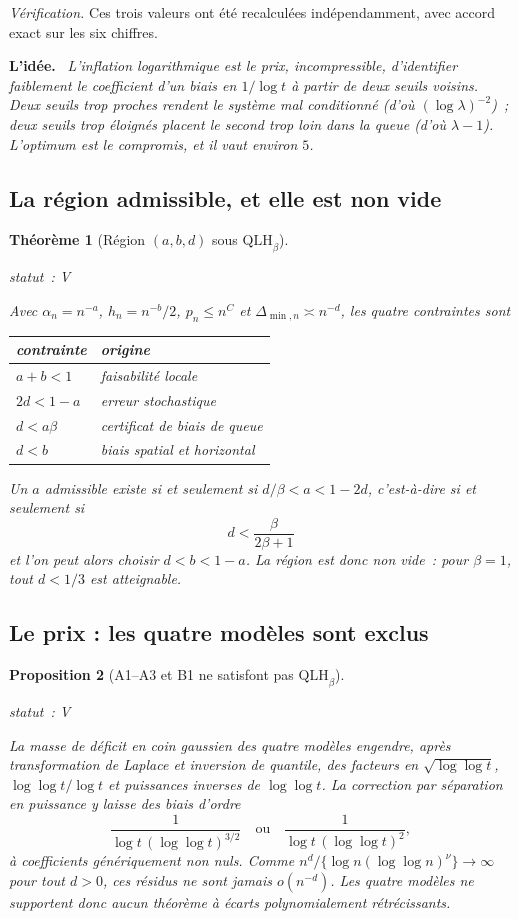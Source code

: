 \documentclass[11pt]{article}
\theoremstyle{plain}
\newtheorem{theoreme}{Théorème}[section]
\newtheorem{proposition}[theoreme]{Proposition}
\theoremstyle{definition}
\theoremstyle{remark}
\newcommand{\1}{\mathbf 1}
\newcommand{\statut}[1]{%
  \nopagebreak\par\nopagebreak
  \hfill{\normalfont\footnotesize\textcolor{gris}{statut~: #1}}%
  \par\nopagebreak\vspace{-2pt}}
\newenvironment{idee}
  {\par\medskip\noindent\textcolor{bleu}{\textbf{L'idée.}}\ \itshape}
  {\par\medskip}
\begin{document}
\noindent
\emph{Vérification.} Ces trois valeurs ont été recalculées
indépendamment, avec accord exact sur les six chiffres.

\begin{idee}
L'inflation logarithmique est le prix, incompressible, d'identifier
\emph{faiblement} le coefficient d'un biais en $1/\log t$ à partir de
deux seuils voisins. Deux seuils trop proches rendent le système mal
conditionné (d'où $(\log\lambda)^{-2}$)~; deux seuils trop éloignés
placent le second trop loin dans la queue (d'où $\lambda-1$). L'optimum
est le compromis, et il vaut environ $5$.
\end{idee}

\subsection{La région admissible, et elle est non vide}

\begin{theoreme}[Région $(a,b,d)$ sous $\mathrm{QLH}_\beta$]
\label{thm:region}
\statut{V}
Avec $\alpha_n=n^{-a}$, $h_n=n^{-b}/2$, $p_n\le n^C$ et
$\Delta_{\min,n}\asymp n^{-d}$, les quatre contraintes sont
\begin{center}
\begin{tabular}{@{}ll@{}}
\toprule
contrainte & origine\\
\midrule
$a+b<1$ & faisabilité locale\\
$2d<1-a$ & erreur stochastique\\
$d<a\beta$ & certificat de biais de queue\\
$d<b$ & biais spatial et horizontal\\
\bottomrule
\end{tabular}
\end{center}
Un $a$ admissible existe si et seulement si $d/\beta<a<1-2d$, c'est-à-dire
si et seulement si
\[
 \boxed{\ d<\frac{\beta}{2\beta+1}\ }
\]
et l'on peut alors choisir $d<b<1-a$. La région est donc non vide~: pour
$\beta=1$, tout $d<1/3$ est atteignable.
\end{theoreme}

\subsection{Le prix : les quatre modèles sont exclus}

\begin{proposition}[A1--A3 et B1 ne satisfont pas $\mathrm{QLH}_\beta$]
\label{prop:modeles-exclus}
\statut{V}
La masse de déficit en coin gaussien des quatre modèles engendre, après
transformation de Laplace et inversion de quantile, des facteurs en
$\sqrt{\log\log t}$, $\log\log t/\log t$ et puissances inverses de
$\log\log t$. La correction par séparation en puissance y laisse des
biais d'ordre
\[
 \frac1{\log t\,(\log\log t)^{3/2}}
 \quad\text{ou}\quad
 \frac1{\log t\,(\log\log t)^{2}},
\]
à coefficients génériquement non nuls. Comme
$n^{d}/\{\log n(\log\log n)^\nu\}\to\infty$ pour tout $d>0$, ces résidus
ne sont \emph{jamais} $o(n^{-d})$. Les quatre modèles ne supportent donc
aucun théorème à écarts polynomialement rétrécissants.
\end{proposition}
\end{document}
